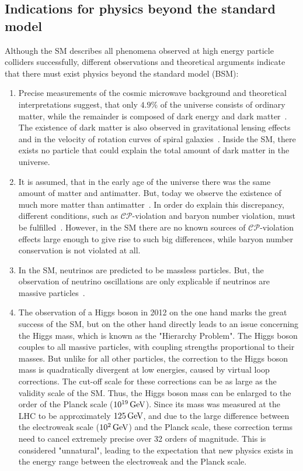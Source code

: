 \subsection*{Indications for physics beyond the standard model}\label{sec:SM_bsm}
Although the SM describes all phenomena observed at high energy particle colliders successfully, different observations and theoretical arguments indicate that there must exist physics beyond the standard model (BSM):
\begin{enumerate}
 \item Precise measurements of the cosmic microwave background and theoretical interpretations suggest, that only $4.9\%$ of the universe consists of ordinary matter, while the remainder is composed of dark energy and dark matter~\cite{DarkMatterPlanck}. The existence of dark matter is also observed in gravitational lensing effects~\cite{DarkMatterLensing} and in the velocity of rotation curves of spiral galaxies~\cite{DarkMatterRotation}. Inside the SM, there exists no particle that could explain the total amount of dark matter in the universe.
 \item It is assumed, that in the early age of the universe there was the same amount of matter and antimatter. But, today we observe the existence of much more matter than antimatter~\cite{Antimatter,AsymSM}. In order do explain this discrepancy, different conditions, such as $\mathcal{CP}$-violation and baryon number violation, must be fulfilled~\cite{Sakharov}. However, in the SM there are no known sources of $\mathcal{CP}$-violation effects large enough to give rise to such big differences, while baryon number conservation is not violated at all.
 \item In the SM, neutrinos are predicted to be massless particles. But, the observation of neutrino oscillations are only explicable if neutrinos are massive particles~\cite{NeutrinoMass,PDG}.
 \item The observation of a Higgs boson in 2012 on the one hand marks the great success of the SM, but on the other hand directly leads to an issue concerning the Higgs mass, which is known as the "Hierarchy Problem". The Higgs boson couples to all massive particles, with coupling strengths proportional to their masses. But unlike for all other particles, the correction to the Higgs boson mass is quadratically divergent at low energies, caused by virtual loop corrections. The cut-off scale for these corrections can be as large as the validity scale of the SM. Thus, the Higgs boson mass can be enlarged to the order of the Planck scale ($10^{19}\,\text{Ge\hspace{-.08em}V}$). Since its mass was measured at the LHC to be approximately $125\,\text{Ge\hspace{-.08em}V}$, and due to the large difference between the electroweak scale ($10^2\,\text{Ge\hspace{-.08em}V}$) and the Planck scale, these correction terms need to cancel extremely precise over 32 orders of magnitude. This is considered "unnatural", leading to the expectation that new physics exists in the energy range between the electroweak and the Planck scale.

\end{enumerate}
